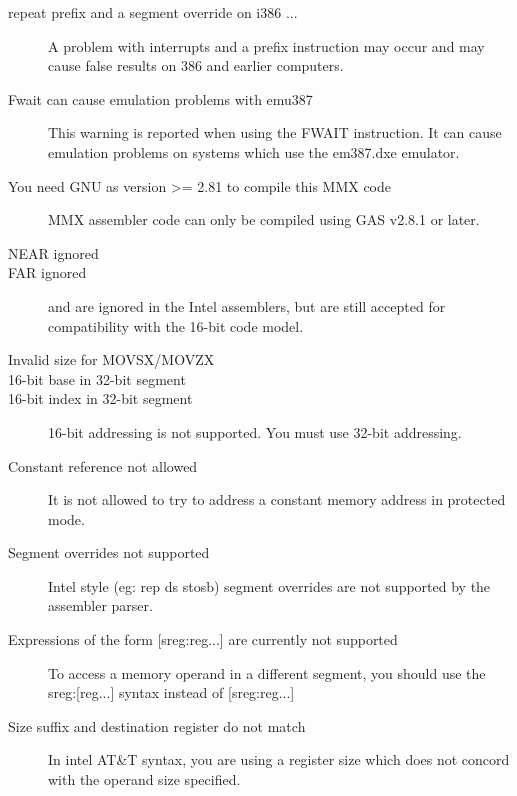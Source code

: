 \begin{description}
\item [repeat prefix and a segment override on \var{<=} i386 ...]
A problem with interrupts and a prefix instruction may occur and may cause
false results on 386 and earlier computers.

\item [Fwait can cause emulation problems with emu387]
This warning is reported when using the FWAIT instruction. It can
cause emulation problems on systems which use the em387.dxe emulator.

\item [You need GNU as version >= 2.81 to compile this MMX code]
MMX assembler code can only be compiled using GAS v2.8.1 or later.

\item [NEAR ignored]
\item [FAR ignored]
\label{FarIgnored}
 and  are ignored in the Intel assemblers, but
are still accepted for compatibility with the 16-bit code model.

\item [Invalid size for MOVSX/MOVZX]

\item [16-bit base in 32-bit segment]
\item [16-bit index in 32-bit segment]
16-bit addressing is not supported. You must use 32-bit addressing.


\item [Constant reference not allowed]
It is not allowed to try to address a constant memory address in protected
mode.

\item [Segment overrides not supported]
Intel style (eg: rep ds stosb) segment overrides are not supported by
the assembler parser.

\item [{Expressions of the form [sreg:reg...] are currently not supported}]
To access a memory operand in a different segment, you should use the
sreg:[reg...] syntax instead of [sreg:reg...]

\item [Size suffix and destination register do not match]
In intel AT\&T syntax, you are using a register size which does
not concord with the operand size specified.


\end{description}
